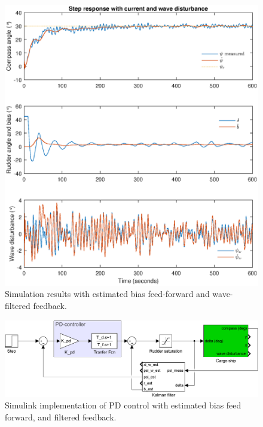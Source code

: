 \begin{figure}
    \centering
    \includegraphics[width=\textwidth]{images/oppg5/5e.eps}
    \caption{Simulation results with estimated bias feed-forward and wave-filtered feedback.}
    \label{fig:5e}
\end{figure}

\begin{figure}
    \centering
    \includegraphics[width=\textwidth]{images/oppg5/bias_FF_and_filtered_FB.pdf}
    \caption{Simulink implementation of PD control with estimated bias feed forward, and filtered feedback.}
    \label{fig:filtered_fb}
\end{figure}
